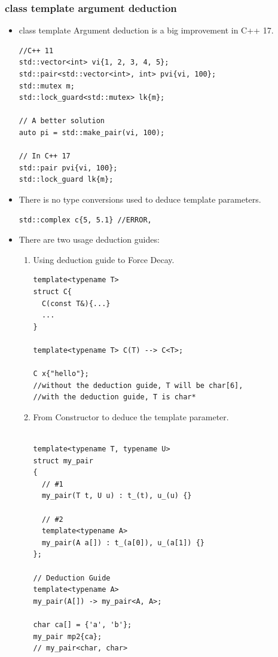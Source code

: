 \documentclass[a4paper,11pt,twoside]{book}
\begin{document}
\subsubsection{class template argument deduction}
\begin{itemize}
	\item class template Argument deduction is a big improvement in C++ 17. 
\begin{lstlisting}
//C++ 11
std::vector<int> vi{1, 2, 3, 4, 5};
std::pair<std::vector<int>, int> pvi{vi, 100};
std::mutex m;
std::lock_guard<std::mutex> lk{m};

// A better solution
auto pi = std::make_pair(vi, 100);

// In C++ 17
std::pair pvi{vi, 100};
std::lock_guard lk{m};
\end{lstlisting}

	\item There is no type conversions used to deduce template parameters.
\begin{lstlisting}
std::complex c{5, 5.1} //ERROR, 
\end{lstlisting}
		\item There are two usage deduction guides:
		\begin{enumerate}
				\item Using deduction guide to Force Decay.
\begin{lstlisting}
template<typename T>
struct C{
  C(const T&){...}
  ...
}

template<typename T> C(T) --> C<T>;

C x{"hello"};
//without the deduction guide, T will be char[6],
//with the deduction guide, T is char*
\end{lstlisting}
				\item From Constructor to deduce the template parameter. 
\begin{lstlisting}

template<typename T, typename U>
struct my_pair
{
  // #1
  my_pair(T t, U u) : t_(t), u_(u) {}
  
  // #2
  template<typename A>
  my_pair(A a[]) : t_(a[0]), u_(a[1]) {}
};

// Deduction Guide
template<typename A>
my_pair(A[]) -> my_pair<A, A>;

char ca[] = {'a', 'b'};
my_pair mp2{ca};
// my_pair<char, char>
\end{lstlisting}
		\end{enumerate}

	
\end{itemize}
\end{document}
